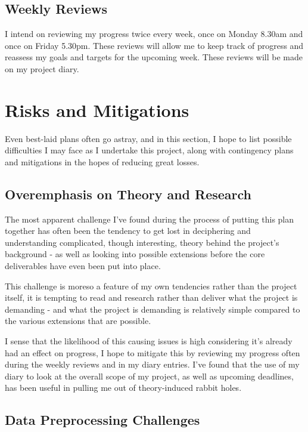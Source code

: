 \documentclass[report,10pt]{article}
\begin{document}
\subsection{Weekly Reviews}
I intend on reviewing my progress twice every week, once on Monday 8.30am and once on Friday 5.30pm. These reviews will allow me to keep track of progress and reassess my goals and targets for the upcoming week. These reviews will be made on my project diary.
\pagebreak
\section{Risks and Mitigations}
Even best-laid plans often go astray, and in this section, I hope to list possible difficulties I may face as I undertake this project, along with contingency plans and mitigations in the hopes of reducing great losses.
\subsection{Overemphasis on Theory and Research}

The most apparent challenge I've found during the process of putting this plan together has often been the tendency to get lost in deciphering and understanding complicated, though interesting, theory behind the project's background - as well as looking into possible extensions before the core deliverables have even been put into place. \par
This challenge is moreso a feature of my own tendencies rather than the project itself, it is tempting to read and research rather than deliver what the project is demanding - and what the project is demanding is relatively simple compared to the various extensions that are possible. \par
I sense that the likelihood of this causing issues is high considering it's already had an effect on progress, I hope to mitigate this by reviewing my progress often during the weekly reviews and in my diary entries. I've found that the use of my diary to look at the overall scope of my project, as well as upcoming deadlines, has been useful in pulling me out of theory-induced rabbit holes. 

\subsection{Data Preprocessing Challenges}
\end{document}
